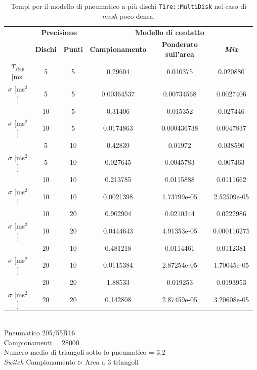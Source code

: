 \begin{table}
	\centering
	\begin{tabular}{c|c|c|c|c|c|}
		\cline{2-6} 
		& \multicolumn{2}{c|}{\textbf{Precisione}} &\multicolumn{3}{c|}{\textbf{Modello di contatto}} \\
		\cline{2-6} 
		& \textbf{Dischi} & \textbf{Punti} & \textbf{Campionamento} & \textbf{Ponderato sull'area} & \textbf{\textit{Mix}} \\ 
		\hline
		
		\multicolumn{1}{|c|}{$T_{step}$ [ms]} & 5 & 5 & 0.29604 & 0.010375 & 0.020880 \\ 
		\hline 
		\multicolumn{1}{|c|}{$\sigma$ [ms$^2$]} & 5 & 5 & 0.00364537 & 0.00734568 & 0.0027406 \\ 
		\hhline{======}
		
		\multicolumn{1}{|c|}{$T_{step}$ [ms]} & 10 & 5 & 0.31406 & 0.015352 & 0.027446 \\ 
		\hline 
		\multicolumn{1}{|c|}{$\sigma$ [ms$^2$]} & 10 & 5 & 0.0174863 & 0.000436738 & 0.0047837 \\ 
		\hhline{======}
		
		\multicolumn{1}{|c|}{$T_{step}$ [ms]} & 5 & 10 & 0.42839 & 0.01972 & 0.038590 \\ 
		\hline 
		\multicolumn{1}{|c|}{$\sigma$ [ms$^2$]} & 5 & 10 & 0.027645 & 0.0045783 & 0.007463 \\ 
		\hhline{======}
		
		\multicolumn{1}{|c|}{$T_{step}$ [ms]} & 10 & 10 & 0.213785 & 0.0115888 & 0.0111662 \\ 
		\hline 
		\multicolumn{1}{|c|}{$\sigma$ [ms$^2$]} & 10 & 10 & 0.0021398 & 1.73799e-05 & 2.52509e-05 \\
		\hhline{======}

		\multicolumn{1}{|c|}{$T_{step}$ [ms]} & 10 & 20 & 0.902904 & 0.0210344 & 0.0222986 \\ 
		\hline 
		\multicolumn{1}{|c|}{$\sigma$ [ms$^2$]} & 10 & 20 & 0.0444643 & 4.91353e-05 & 0.000116275 \\ 
		\hhline{======}
		
		\multicolumn{1}{|c|}{$T_{step}$ [ms]} & 20 & 10 & 0.481218 & 0.0114461 & 0.0112381 \\ 
		\hline 
		\multicolumn{1}{|c|}{$\sigma$ [ms$^2$]} & 20 & 10 & 0.0115384 & 2.87254e-05 & 1.70045e-05 \\ 
		\hhline{======}
		
		\multicolumn{1}{|c|}{$T_{step}$ [ms]} & 20 & 20 & 1.88533 & 0.019253 & 0.0193953 \\ 
		\hline 
		\multicolumn{1}{|c|}{$\sigma$ [ms$^2$]} & 20 & 20 & 0.142808 & 2.87459e-05 & 3.20608e-05 \\ 
		\hline
	\end{tabular}
	\\[0.5cm]
	Pneumatico 205/55R16\\
	Campionamenti = 28000\\
	Numero medio di triangoli sotto lo pneumatico = 3.2\\
	\textit{Switch} Campionamento $\triangleright$ Area a 3 triangoli
	\caption{Tempi per il modello di pneumatico a più dischi \texttt{Tire::MultiDisk} nel caso di \textit{mesh} poco densa.}
	\label{MDpiano}
\end{table}
